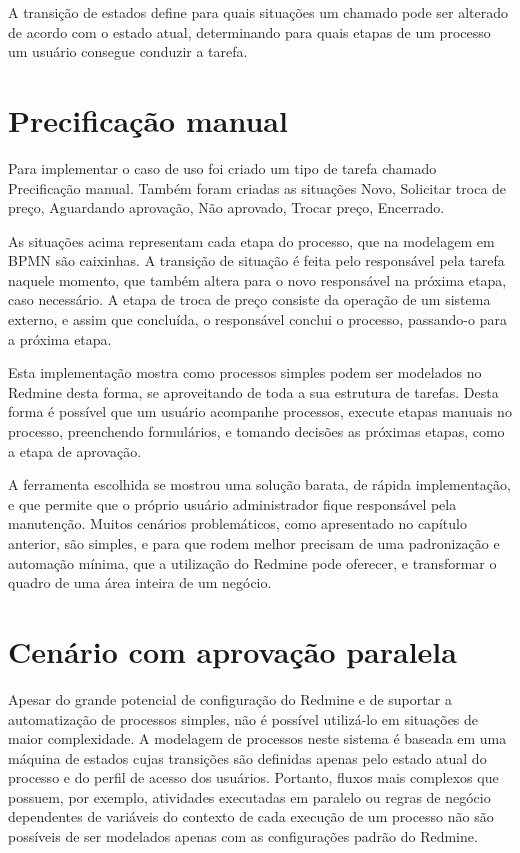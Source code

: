 A transição de estados define para quais situações um chamado pode ser alterado de acordo com o estado atual, determinando para quais etapas de um processo um usuário consegue conduzir a tarefa.

\section{Precificação manual}\label{sec:redmine-impl-caso-uso}

Para implementar o caso de uso foi criado um tipo de tarefa chamado Precificação manual. Também foram criadas as situações Novo, Solicitar troca de preço, Aguardando aprovação, Não aprovado, Trocar preço, Encerrado.

As situações acima representam cada etapa do processo, que na modelagem em BPMN são caixinhas. A transição de situação é feita pelo responsável pela tarefa naquele momento, que também altera para o novo responsável na próxima etapa, caso necessário. A etapa de troca de preço consiste da operação de um sistema externo, e assim que concluída, o responsável conclui o processo, passando-o para a próxima etapa.

Esta implementação mostra como processos simples podem ser modelados no Redmine desta forma, se aproveitando de toda a sua estrutura de tarefas. Desta forma é possível que um usuário acompanhe processos, execute etapas manuais no processo, preenchendo formulários, e tomando decisões as próximas etapas, como a etapa de aprovação.

A ferramenta escolhida se mostrou uma solução barata, de rápida implementação, e que permite que o próprio usuário administrador fique responsável pela manutenção. Muitos cenários problemáticos, como apresentado no capítulo anterior, são simples, e para que rodem melhor precisam de uma padronização e automação mínima, que a utilização do Redmine pode oferecer, e transformar o quadro de uma área inteira de um negócio.

\section{Cenário com aprovação paralela}\label{sec:cenario-complexo}

Apesar do grande potencial de configuração do Redmine e de suportar a automatização de processos simples, não é possível utilizá-lo em situações de maior complexidade. A modelagem de processos neste sistema é baseada em uma máquina de estados cujas transições são definidas apenas pelo estado atual do processo e do perfil de acesso dos usuários. Portanto, fluxos mais complexos que possuem, por exemplo, atividades executadas em paralelo ou regras de negócio dependentes de variáveis do contexto de cada execução de um processo não são possíveis de ser modelados apenas com as configurações padrão do Redmine.

